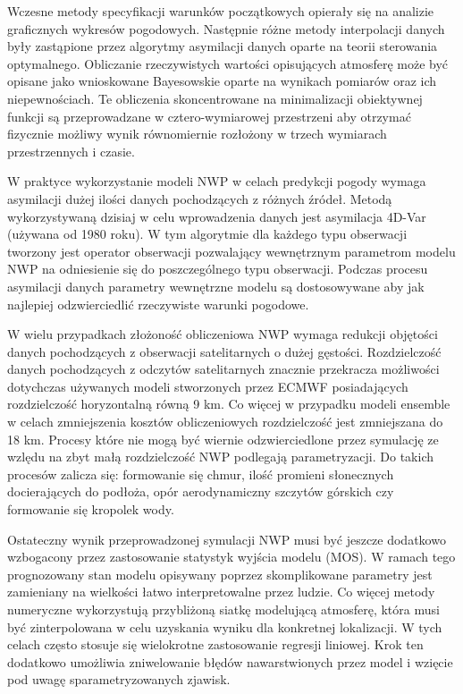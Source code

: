 Wczesne metody specyfikacji warunków początkowych opierały się na analizie graficznych wykresów 
pogodowych. Następnie różne metody interpolacji danych były zastąpione przez algorytmy
asymilacji danych oparte na teorii sterowania optymalnego. Obliczanie rzeczywistych wartości
opisujących atmosferę może być opisane jako wnioskowane Bayesowskie oparte na wynikach pomiarów
oraz ich niepewnościach. Te obliczenia skoncentrowane na minimalizacji obiektywnej funkcji 
są przeprowadzane w cztero-wymiarowej przestrzeni aby otrzymać fizycznie możliwy wynik
równomiernie rozłożony w trzech wymiarach przestrzennych i czasie.

W praktyce wykorzystanie modeli NWP w celach predykcji pogody wymaga asymilacji dużej ilości
danych pochodzących z różnych źródeł. Metodą wykorzystywaną dzisiaj w celu wprowadzenia
danych jest asymilacja 4D-Var (używana od 1980 roku). W tym algorytmie dla każdego typu obserwacji tworzony jest
operator obserwacji pozwalający wewnętrznym parametrom modelu NWP na odniesienie się
do poszczególnego typu obserwacji. Podczas procesu asymilacji danych parametry wewnętrzne
modelu są dostosowywane aby jak najlepiej odzwierciedlić rzeczywiste warunki pogodowe.

W wielu przypadkach złożoność obliczeniowa NWP wymaga redukcji objętości danych pochodzących
z obserwacji satelitarnych o dużej gęstości. Rozdzielczość danych pochodzących z odczytów
satelitarnych znacznie przekracza możliwości dotychczas używanych modeli stworzonych przez
ECMWF posiadających rozdzielczość horyzontalną równą 9 km. Co więcej w przypadku modeli
ensemble w celach zmniejszenia kosztów obliczeniowych rozdzielczość jest zmniejszana do 18 km.
Procesy które nie mogą być wiernie odzwierciedlone przez symulację
ze wzlędu na zbyt małą rozdzielczość NWP podlegają parametryzacji.
Do takich procesów zalicza się: formowanie się chmur, ilość promieni słonecznych docierających do 
podłoża, opór aerodynamiczny szczytów górskich czy formowanie się kropolek wody.

Ostateczny wynik przeprowadzonej symulacji NWP musi być jeszcze dodatkowo wzbogacony przez zastosowanie
statystyk wyjścia modelu (MOS). W ramach tego prognozowany stan modelu opisywany poprzez skomplikowane
parametry jest zamieniany na wielkości łatwo interpretowalne przez ludzie. Co więcej metody numeryczne
wykorzystują przybliżoną siatkę modelującą atmosferę, która musi być zinterpolowana w celu uzyskania
wyniku dla konkretnej lokalizacji. W tych celach często stosuje się wielokrotne zastosowanie 
regresji liniowej. Krok ten dodatkowo umożliwia zniwelowanie błędów nawarstwionych przez model i wzięcie
pod uwagę sparametryzowanych zjawisk.

